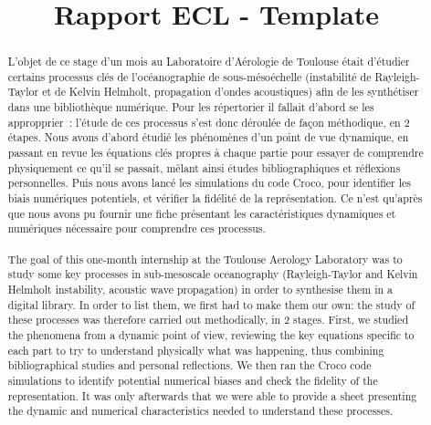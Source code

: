 \documentclass{rapportECC}
\title{Rapport ECL - Template} %
\begin{document}





        
\fairemarges %
\fairepagedegarde %


\tabledematieres %

\onehalfspacing
\begin{abstract}
    \onehalfspacing
    L’objet de ce stage d’un mois au Laboratoire d’Aérologie de Toulouse était d’étudier certains processus clés de l’océanographie de sous-mésoéchelle (instabilité de Rayleigh-Taylor et de Kelvin Helmholt, propagation d’ondes acoustiques) afin de les synthétiser dans une bibliothèque numérique. Pour les répertorier il fallait d’abord se les appropprier : l’étude de ces processus s’est donc déroulée de façon méthodique, en 2 étapes. Nous avons d’abord étudié les phénomènes d’un point de vue dynamique, en passant en revue les équations clés propres à chaque partie pour essayer de comprendre physiquement ce qu’il se passait, mêlant ainsi études bibliographiques et réflexions personnelles. Puis nous avons lancé les simulations du code Croco, pour identifier les biais numériques potentiels, et vérifier la fidélité de la représentation. Ce n’est qu’après que nous avons pu fournir une fiche présentant les caractéristiques dynamiques et numériques  nécessaire pour comprendre ces processus.
\\
\vspace{0,5 cm}
\\
The goal of this one-month internship at the Toulouse Aerology Laboratory was to study some key processes in sub-mesoscale oceanography (Rayleigh-Taylor and Kelvin Helmholt instability, acoustic wave propagation) in order to synthesise them in a digital library. In order to list them, we first had to make them our own: the study of these processes was therefore carried out methodically, in 2 stages. First, we studied the phenomena from a dynamic point of view, reviewing the key equations specific to each part to try to understand physically what was happening, thus combining bibliographical studies and personal reflections. We then ran the Croco code simulations to identify potential numerical biases and check the fidelity of the representation. It was only afterwards that we were able to provide a sheet presenting the dynamic and numerical characteristics needed to understand these processes.
\end{abstract}
\newpage
\end{document}
